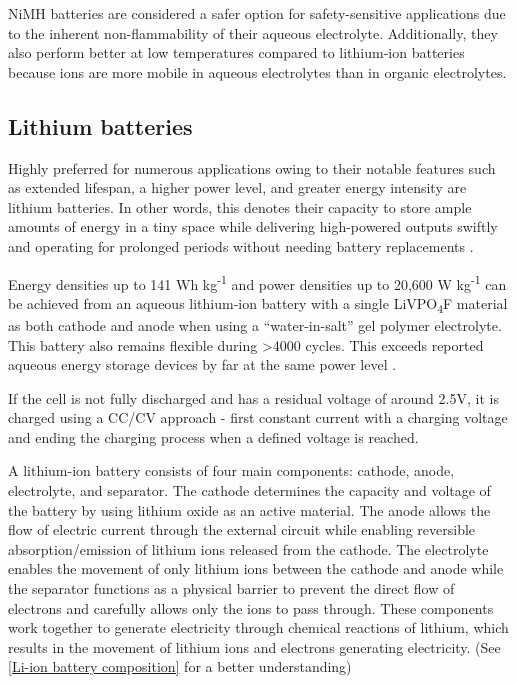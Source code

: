 NiMH batteries are considered a safer option for safety-sensitive applications due to the inherent non-flammability of their aqueous electrolyte. Additionally, they also perform better at low temperatures compared to lithium-ion batteries because ions are more mobile in aqueous electrolytes than in organic electrolytes.
\cite{Babu:2023}



\subsection{Lithium batteries}


Highly preferred for numerous applications owing to their notable features such as extended lifespan, a higher power level, and greater energy intensity are lithium batteries. In other words, this denotes their capacity to store ample amounts of energy in a tiny space while delivering high-powered outputs swiftly and operating for prolonged periods without needing battery replacements \cite{Babu:2023}.

Energy densities up to 141 Wh kg\textsuperscript{-1} and power densities up to 20,600 W kg\textsuperscript{-1} can be achieved from an aqueous lithium-ion battery with a single LiVPO\textsubscript{4}F material as both cathode and anode when using a “water-in-salt” gel polymer electrolyte. This battery also remains flexible during >4000 cycles. This exceeds reported aqueous energy storage devices by far at the same power level \cite{Yang:2017}.


If the cell is not fully discharged and has a residual voltage of around 2.5V, it is charged using a CC/CV approach - first constant current with a charging voltage and ending the charging process when a defined voltage is reached. \cite{Scherer:2022}

A lithium-ion battery consists of four main components: cathode, anode, electrolyte, and separator. The cathode determines the capacity and voltage of the battery by using lithium oxide as an active material. The anode allows the flow of electric current through the external circuit while enabling reversible absorption/emission of lithium ions released from the cathode. The electrolyte enables the movement of only lithium ions between the cathode and anode while the separator functions as a physical barrier to prevent the direct flow of electrons and carefully allows only the ions to pass through\cite{Samsung:2016,Li:2021}. %
These components work together to generate electricity through chemical reactions of lithium, which results in the movement of lithium ions and electrons generating electricity. (See \ref{Li-ion battery composition} for a better understanding)

